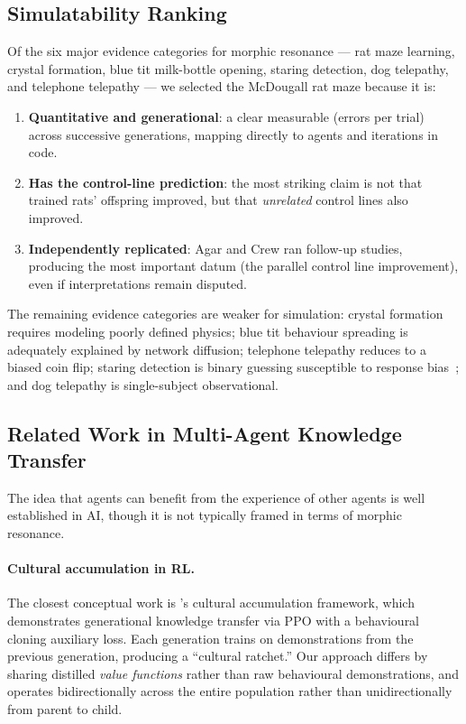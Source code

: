 \documentclass[twoside,11pt]{article}
\begin{document}
\subsection{Simulatability Ranking}
\label{sec:background:ranking}

Of the six major evidence categories for morphic resonance --- rat maze
learning, crystal formation, blue tit milk-bottle opening, staring detection,
dog telepathy, and telephone telepathy --- we selected the McDougall rat maze
because it is:

\begin{enumerate}[leftmargin=2em]
    \item \textbf{Quantitative and generational}: a clear measurable
          (errors per trial) across successive generations, mapping directly
          to agents and iterations in code.
    \item \textbf{Has the control-line prediction}: the most striking claim
          is not that trained rats' offspring improved, but that
          \emph{unrelated} control lines also improved.
    \item \textbf{Independently replicated}: Agar and Crew ran follow-up
          studies, producing the most important datum (the parallel control
          line improvement), even if interpretations remain disputed.
\end{enumerate}

The remaining evidence categories are weaker for simulation: crystal
formation requires modeling poorly defined physics; blue tit behaviour
spreading is adequately explained by network diffusion; telephone telepathy
reduces to a biased coin flip; staring detection is binary guessing
susceptible to response bias~\citep{colwell2000}; and dog telepathy is
single-subject observational.

\subsection{Related Work in Multi-Agent Knowledge Transfer}
\label{sec:background:marl}

The idea that agents can benefit from the experience of other agents is well
established in AI, though it is not typically framed in terms of morphic
resonance.

\paragraph{Cultural accumulation in RL.}
The closest conceptual work is \citet{cook2024}'s cultural accumulation
framework, which demonstrates generational knowledge transfer via PPO with a
behavioural cloning auxiliary loss.  Each generation trains on demonstrations
from the previous generation, producing a ``cultural ratchet.''  Our approach
differs by sharing distilled \emph{value functions} rather than raw behavioural
demonstrations, and operates bidirectionally across the entire population
rather than unidirectionally from parent to child.
\end{document}
